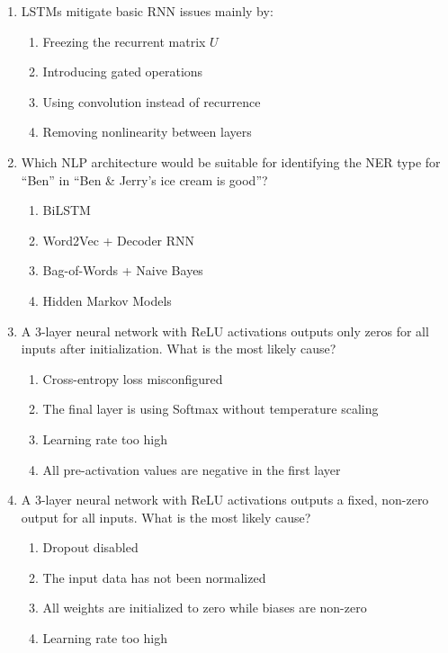 \documentclass[12pt]{article}
\begin{document}
\begin{enumerate}[label=Q\arabic*.]
 \item LSTMs mitigate basic RNN issues mainly by:
 \begin{enumerate}[label=(\Alph*)]
     \item Freezing the recurrent matrix $U$
     \item Introducing gated operations
     \item Using convolution instead of recurrence
     \item Removing nonlinearity between layers
 \end{enumerate}
 
 \item Which NLP architecture would be suitable for identifying the NER type for ``Ben'' in ``Ben \& Jerry's ice cream is good''?
 \begin{enumerate}[label=(\Alph*)]
     \item BiLSTM
     \item Word2Vec + Decoder RNN
     \item Bag-of-Words + Naive Bayes
     \item Hidden Markov Models
 \end{enumerate}
 
 \item A 3-layer neural network with ReLU activations outputs only zeros for all inputs after initialization. What is the most likely cause?
 \begin{enumerate}[label=(\Alph*)]
     \item Cross-entropy loss misconfigured
     \item The final layer is using Softmax without temperature scaling
     \item Learning rate too high
     \item All pre-activation values are negative in the first layer
 \end{enumerate}
 
 \item A 3-layer neural network with ReLU activations outputs a fixed, non-zero output for all inputs. What is the most likely cause?
 \begin{enumerate}[label=(\Alph*)]
     \item Dropout disabled
     \item The input data has not been normalized
     \item All weights are initialized to zero while biases are non-zero
     \item Learning rate too high
 \end{enumerate}
 

\end{enumerate}
\end{document}
